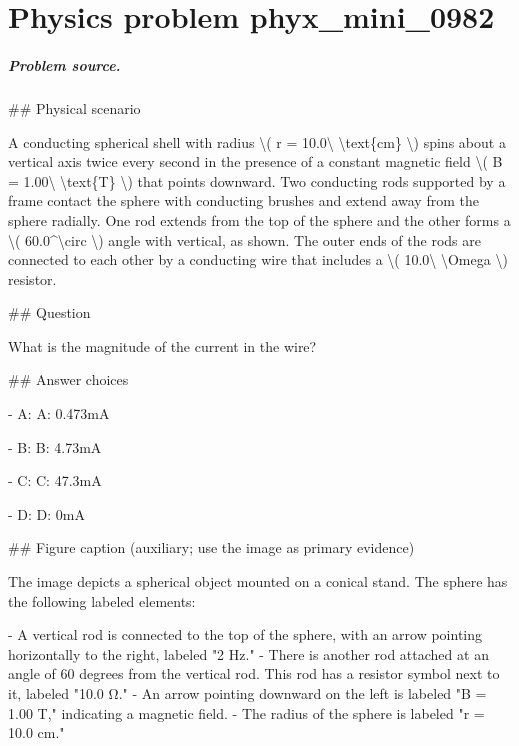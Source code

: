 
\chapter{Physics problem phyx\_mini\_0982}
\label{ch:PhyXMiniProblems_problem_phyx_mini_0982}

\paragraph{Problem source.}
\#\# Physical scenario

A conducting spherical shell with radius \textbackslash{}( r = 10.0\textbackslash{} \textbackslash{}text\{cm\} \textbackslash{}) spins about a vertical axis twice every second in the presence of a constant magnetic field \textbackslash{}( B = 1.00\textbackslash{} \textbackslash{}text\{T\} \textbackslash{}) that points downward. Two conducting rods supported by a frame contact the sphere with conducting brushes and extend away from the sphere radially. One rod extends from the top of the sphere and the other forms a \textbackslash{}( 60.0\textasciicircum{}\textbackslash{}circ \textbackslash{}) angle with vertical, as shown. The outer ends of the rods are connected to each other by a conducting wire that includes a \textbackslash{}( 10.0\textbackslash{} \textbackslash{}Omega \textbackslash{}) resistor.

\#\# Question

What is the magnitude of the current in the wire?

\#\# Answer choices

- A: A: 0.473mA

- B: B: 4.73mA

- C: C: 47.3mA

- D: D: 0mA

\#\# Figure caption (auxiliary; use the image as primary evidence)

The image depicts a spherical object mounted on a conical stand. The sphere has the following labeled elements:

- A vertical rod is connected to the top of the sphere, with an arrow pointing horizontally to the right, labeled "2 Hz."
- There is another rod attached at an angle of 60 degrees from the vertical rod. This rod has a resistor symbol next to it, labeled "10.0 Ω."
- An arrow pointing downward on the left is labeled "B = 1.00 T," indicating a magnetic field.
- The radius of the sphere is labeled "r = 10.0 cm."

